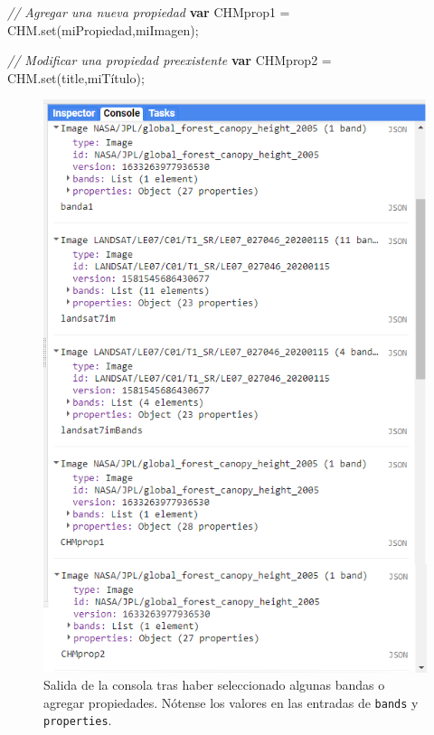 \documentclass[
  12pt,
  letterpaper,
  twoside]{book}
\newenvironment{Shaded}{\begin{snugshade}}{\end{snugshade}}
\newcommand{\CommentTok}[1]{\textcolor[rgb]{0.24,0.58,0.00}{\textit{#1}}}
\newcommand{\ControlFlowTok}[1]{\textcolor[rgb]{0.00,0.00,0.00}{\textbf{#1}}}
\newcommand{\FunctionTok}[1]{\textcolor[rgb]{0.48,0.12,0.64}{#1}}
\newcommand{\NormalTok}[1]{#1}
\newcommand{\OperatorTok}[1]{\textcolor[rgb]{0.00,0.00,0.00}{#1}}
\newcommand{\StringTok}[1]{\textcolor[rgb]{0.87,0.29,0.22}{#1}}
\begin{document}
\begin{Shaded}
\begin{Highlighting}[]
\CommentTok{// Agregar una nueva propiedad}
\ControlFlowTok{var}\NormalTok{ CHMprop1 }\OperatorTok{=}\NormalTok{ CHM}\OperatorTok{.}\FunctionTok{set}\NormalTok{(}\StringTok{\textquotesingle{}miPropiedad\textquotesingle{}}\OperatorTok{,}\StringTok{\textquotesingle{}miImagen\textquotesingle{}}\NormalTok{)}\OperatorTok{;}

\CommentTok{// Modificar una propiedad preexistente}
\ControlFlowTok{var}\NormalTok{ CHMprop2 }\OperatorTok{=}\NormalTok{ CHM}\OperatorTok{.}\FunctionTok{set}\NormalTok{(}\StringTok{\textquotesingle{}title\textquotesingle{}}\OperatorTok{,}\StringTok{\textquotesingle{}miTítulo\textquotesingle{}}\NormalTok{)}\OperatorTok{;}
\end{Highlighting}
\end{Shaded}




\begin{figure}[H]

{\centering \includegraphics[width=0.8\linewidth]{Img/ej275} 

}

\caption{Salida de la consola tras haber seleccionado algunas bandas o agregar propiedades. Nótense los valores en las entradas de \texttt{bands} y \texttt{properties}.}\label{fig:f95}
\end{figure}
\end{document}

